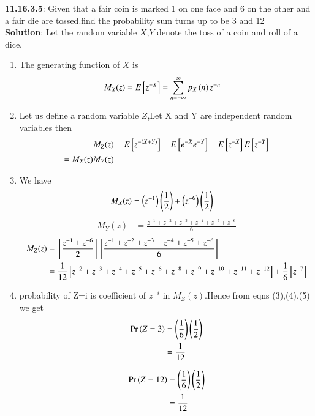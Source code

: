 \documentclass[journal,12pt,onecolumn]{IEEEtran}
\begin{document}
 \bigskip 
 \renewcommand{\thefigure}{\theenumi} 
 \renewcommand{\thetable}{\theenumi} 
 \textbf{11.16.3.5}: 
 Given that a fair coin is marked 1 on one face and 6 on the other and a fair die are tossed.find the probability sum turns up to be 3 and 12 \\ 
 \textbf{Solution}: 
         Let the random variable  $X$,$Y$ denote the toss of a coin and roll of a dice.
 \begin{enumerate}[label=(\alph*)] 
	 \item   The  generating function of $X$ is  
                         \begin{align} 
				 M_X(z) &= E{}\left[z^{-X}\right] 
				 = \sum_{n=-\infty}^{\infty}p_X\left(n\right)z^{-n}  
                         \end{align} 
		 \item Let us define a random variable $Z$,Let X and Y are independent random variables then 
			 \begin{align}
				 M_Z(z) &= E{}\left[z^{-(X + Y)}\right] 
					 = E{}\left[e^{-X}e^{-Y}\right] = E{}\left[z^{-X}\right]E{}\left[z^{-Y}\right] \\
					 = M_X(z)M_Y(z) 
			 \end{align} 
		 \item	We have 
			\begin{align}
				M_X(z) &= \left(z^{-1}\right)\left(\frac{1}{2}\right) + \left(z^{-6}\right)\left(\frac{1}{2}\right) 
			\end{align}
			 \begin{align}
				 M_Y(z) &= \frac{z^{-1} + z^{-2} + z^{-3} + z^{-4} + z^{-5} + z^{-6}}{6} 
			 \end{align}
			\begin{align}
			M_Z(z) &= {}\left[\frac{z^{-1} + z^{-6}}{2}\right]{}\left[\frac{z^{-1} + z^{-2} + z^{-3} + z^{-4} + z^{-5} + z^{-6}}{6}\right] \\
				&= \frac{1}{12}{}\left[z^{-2} + z^{-3} + z^{-4} + z^{-5} + z^{-6} + z^{-8} + z^{-9} + z^{-10} + z^{-11} + z^{-12}\right] + \frac{1}{6}{}\left[z^{-7}\right]
			\end{align}
		\item probability of Z=i is coefficient of $z^{-i}$ in $M_Z(z)$.Hence from eqns (3),(4),(5) we get
	   \begin{align}
		   \Pr\left(Z = 3\right) &= \left(\frac{1}{6}\right)\left(\frac{1}{2}\right) \\ 
		      &= \frac{1}{12}
	      \end{align}
      
              \begin{align}
		      \Pr\left(Z = 12\right) &= \left(\frac{1}{6}\right)\left(\frac{1}{2}\right) \\
		      &= \frac{1}{12}
	      \end{align}
 \end{enumerate} 
 
\end{document}

